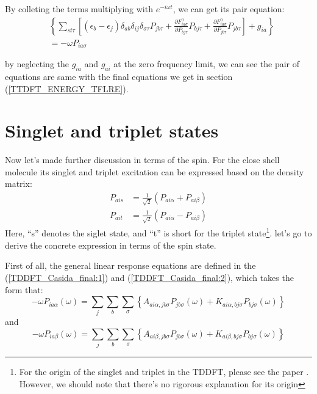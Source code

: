 By colleting the terms multiplying with $e^{-i\omega t}$, we can get
its pair equation:
\begin{align}
 \label{Grodon_TDDFT_equation:19}
&\left\lbrace 
\sum_{st\tau}\left[(\epsilon_{b} -
\epsilon_{j})
\delta_{ab}\delta_{ij}\delta_{\sigma\tau}P_{jb\tau} +
\frac{\partial
F^{0}_{ia\sigma}}{\partial
P_{bj\tau}}P_{bj\tau} + \frac{\partial
F^{0}_{ia\sigma}}{\partial
P_{jb\tau}}P_{jb\tau} \right] 
+ g_{ia} \right\rbrace \nonumber \\
&=-\omega P_{ia\sigma}
\end{align}

by neglecting the $g_{ia}$ and $g_{ai}$ at the zero frequency limit,
we can see the pair of equations are same with the final equations we
get in section (\ref{TTDFT_ENERGY_TFLRE}).

\section{Singlet and triplet states}
%
%
%
Now let's made further discussion in terms of the spin. For the close
shell molecule its singlet and triplet excitation
can be expressed based on the density
matrix\cite{Bauernschmitt1996454}:
\begin{align}
 \label{TDDFT_singlet_triplet:0}
P_{ais} &= \frac{1}{\sqrt{2}}(P_{ai\alpha} + P_{ai\beta}) \nonumber \\
P_{ait} &= \frac{1}{\sqrt{2}}(P_{ai\alpha} - P_{ai\beta})
\end{align}
Here, ``s'' denotes the siglet state, and ``t'' is short for the
triplet state\footnote{For the origin of the singlet and triplet in
the TDDFT, please see the paper \cite{Gross8}. However, we should
note that there's no rigorous explanation for its origin}.
let's go to derive the concrete expression in terms of the spin state.

First of all, the general linear response equations are defined in
the (\ref{TDDFT_Casida_final:1}) and (\ref{TDDFT_Casida_final:2}),
which takes the form that:
\begin{equation}
 \label{TDDFT_singlet_triplet:1}
-\omega  P_{ia\alpha} (\omega)  = 
\sum_{j}\sum_{b}\sum_{\sigma}\left\lbrace A_{ai\alpha, jb\sigma}
P_{jb\sigma}
(\omega) + K_{ai\alpha, bj\sigma}
P_{bj\sigma}(\omega)\right\rbrace 
\end{equation}
and
\begin{equation}
 \label{TDDFT_singlet_triplet:2}
-\omega  P_{ia\beta} (\omega)  = 
\sum_{j}\sum_{b}\sum_{\sigma}\left\lbrace A_{ai\beta, jb\sigma}
P_{jb\sigma}
(\omega) + K_{ai\beta, bj\sigma}
P_{bj\sigma}(\omega)\right\rbrace 
\end{equation}

